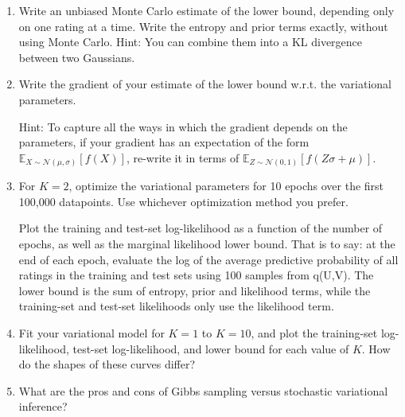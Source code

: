 \documentclass{harvardml}
\theoremstyle{plain}
\begin{document}
\begin{problem}
\begin{enumerate}

\item
Write an unbiased Monte Carlo estimate of the lower bound, depending only on one rating at a time.
Write the entropy and prior terms exactly, without using Monte Carlo.  Hint: You can combine them into a KL divergence between two Gaussians.

\item Write the gradient of your estimate of the lower bound w.r.t. the variational parameters.

Hint: To capture all the ways in which the gradient depends on the parameters, if your gradient has an expectation of the form $\mathbb{E}_{X \sim \mathcal{N}(\mu, \sigma)}[f(X)]$, re-write it in terms of $\mathbb{E}_{Z \sim \mathcal{N}(0, 1)}[f(Z \sigma + \mu)]$.

\item For $K = 2$, optimize the variational parameters for 10 epochs over the first 100,000 datapoints.  Use whichever optimization method you prefer.

Plot the training and test-set log-likelihood as a function of the number of epochs, as well as the marginal likelihood lower bound.
That is to say: at the end of each epoch, evaluate the log of the average predictive probability of all ratings in the training and test sets using 100 samples from q(U,V).
The lower bound is the sum of entropy, prior and likelihood terms, while the training-set and test-set likelihoods only use the likelihood term.

\item Fit your variational model for $K = 1$ to $K = 10$, and plot the training-set log-likelihood, test-set log-likelihood, and lower bound for each value of $K$.
How do the shapes of these curves differ?

\item What are the pros and cons of Gibbs sampling versus stochastic variational inference?

\end{enumerate}
\end{problem}
\end{document}
